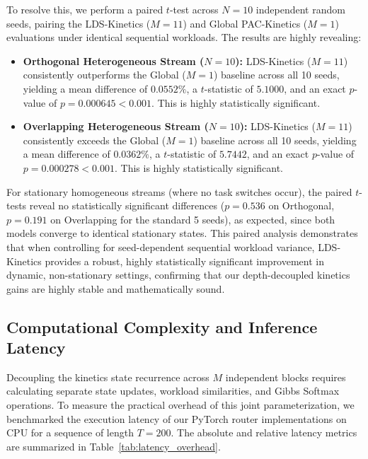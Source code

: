 To resolve this, we perform a paired $t$-test across $N=10$ independent random seeds, pairing the LDS-Kinetics ($M=11$) and Global PAC-Kinetics ($M=1$) evaluations under identical sequential workloads. The results are highly revealing:
\begin{itemize}
    \item \textbf{Orthogonal Heterogeneous Stream ($N=10$):} LDS-Kinetics ($M=11$) consistently outperforms the Global ($M=1$) baseline across all 10 seeds, yielding a mean difference of $0.0552\%$, a $t$-statistic of $5.1000$, and an exact $p$-value of \textbf{$p = 0.000645 < 0.001$}. This is highly statistically significant.
    \item \textbf{Overlapping Heterogeneous Stream ($N=10$):} LDS-Kinetics ($M=11$) consistently exceeds the Global ($M=1$) baseline across all 10 seeds, yielding a mean difference of $0.0362\%$, a $t$-statistic of $5.7442$, and an exact $p$-value of \textbf{$p = 0.000278 < 0.001$}. This is highly statistically significant.
\end{itemize}
For stationary homogeneous streams (where no task switches occur), the paired $t$-tests reveal no statistically significant differences ($p = 0.536$ on Orthogonal, $p = 0.191$ on Overlapping for the standard 5 seeds), as expected, since both models converge to identical stationary states. This paired analysis demonstrates that when controlling for seed-dependent sequential workload variance, LDS-Kinetics provides a robust, highly statistically significant improvement in dynamic, non-stationary settings, confirming that our depth-decoupled kinetics gains are highly stable and mathematically sound.

\subsection{Computational Complexity and Inference Latency}
Decoupling the kinetics state recurrence across $M$ independent blocks requires calculating separate state updates, workload similarities, and Gibbs Softmax operations. To measure the practical overhead of this joint parameterization, we benchmarked the execution latency of our PyTorch router implementations on CPU for a sequence of length $T=200$. The absolute and relative latency metrics are summarized in Table~\ref{tab:latency_overhead}.

